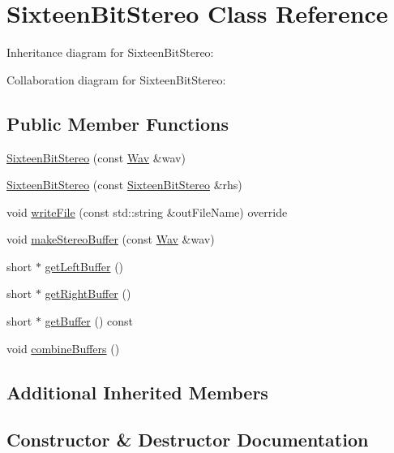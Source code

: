 \hypertarget{classSixteenBitStereo}{}\section{Sixteen\+Bit\+Stereo Class Reference}
\label{classSixteenBitStereo}


Inheritance diagram for Sixteen\+Bit\+Stereo\+:


Collaboration diagram for Sixteen\+Bit\+Stereo\+:
\subsection*{Public Member Functions}
\begin{DoxyCompactItemize}
\item 
\hyperlink{classSixteenBitStereo_a13f3231e9e420e9a7acceaa300ee6c71}{Sixteen\+Bit\+Stereo} (const \hyperlink{classWav}{Wav} \&wav)
\item 
\hyperlink{classSixteenBitStereo_a0cf6266f0f86836c16cf3b278c6466b9}{Sixteen\+Bit\+Stereo} (const \hyperlink{classSixteenBitStereo}{Sixteen\+Bit\+Stereo} \&rhs)
\item 
void \hyperlink{classSixteenBitStereo_afe9914b160b78f406186aa6de864c288}{write\+File} (const std\+::string \&out\+File\+Name) override
\item 
void \hyperlink{classSixteenBitStereo_ae3432aada39f3db75e6452a141eb8465}{make\+Stereo\+Buffer} (const \hyperlink{classWav}{Wav} \&wav)
\item 
short $\ast$ \hyperlink{classSixteenBitStereo_a7f32d58142b5a0b0f2f3f6a3966d3123}{get\+Left\+Buffer} ()
\item 
short $\ast$ \hyperlink{classSixteenBitStereo_a1650df261c08a181004fe08fdf116bde}{get\+Right\+Buffer} ()
\item 
short $\ast$ \hyperlink{classSixteenBitStereo_a33d3535a8b8153adc232fac28d83b554}{get\+Buffer} () const
\item 
void \hyperlink{classSixteenBitStereo_a212fa2366d2dc762a4bdf461be1c76b2}{combine\+Buffers} ()
\end{DoxyCompactItemize}
\subsection*{Additional Inherited Members}


\subsection{Constructor \& Destructor Documentation}
\mbox{\label{classSixteenBitStereo_a13f3231e9e420e9a7acceaa300ee6c71}} 
